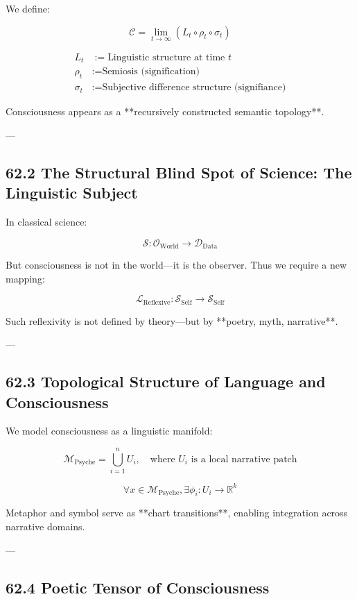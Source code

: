 \documentclass[12pt]{article}
\begin{document}
\begin{enumerate}
We define:

\[
\mathcal{C} = \lim_{t \to \infty} \left( L_t \circ \rho_t \circ \sigma_t \right)
\]

\begin{align*}
L_t &:= \text{Linguistic structure at time } t \\
\rho_t &:= \text{Semiosis (signification)} \\
\sigma_t &:= \text{Subjective difference structure (signifiance)}
\end{align*}

Consciousness appears as a **recursively constructed semantic topology**.

---

\subsection*{62.2 The Structural Blind Spot of Science: The Linguistic Subject}

In classical science:

\[
\mathcal{S} : \mathcal{O}_{\text{World}} \longrightarrow \mathcal{D}_{\text{Data}}
\]

But consciousness is not in the world—it is the observer.  
Thus we require a new mapping:

\[
\mathcal{L}_{\text{Reflexive}} : \mathcal{S}_{\text{Self}} \longrightarrow \mathcal{S}_{\text{Self}}
\]

Such reflexivity is not defined by theory—but by **poetry, myth, narrative**.

---

\subsection*{62.3 Topological Structure of Language and Consciousness}

We model consciousness as a linguistic manifold:

\[
\mathcal{M}_{\text{Psyche}} = \bigcup_{i=1}^{n} U_i, \quad \text{where } U_i \text{ is a local narrative patch}
\]

\[
\forall x \in \mathcal{M}_{\text{Psyche}}, \exists \phi_i : U_i \rightarrow \mathbb{R}^k
\]

Metaphor and symbol serve as **chart transitions**, enabling integration across narrative domains.

---

\subsection*{62.4 Poetic Tensor of Consciousness}


\end{enumerate}
\end{document}
